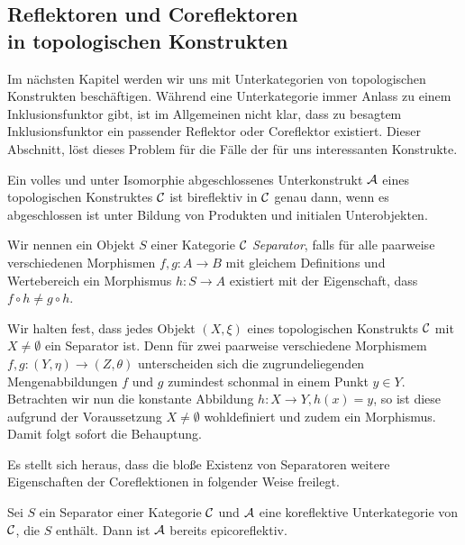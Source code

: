 \subsection{Reflektoren und Coreflektoren\\ in topologischen Konstrukten}

Im nächsten Kapitel werden wir uns mit Unterkategorien von topologischen Konstrukten beschäftigen. Während eine Unterkategorie immer Anlass zu einem Inklusionsfunktor gibt, ist im Allgemeinen nicht klar, dass zu besagtem Inklusionsfunktor ein passender Reflektor oder Coreflektor existiert. 
Dieser Abschnitt, löst dieses Problem für die Fälle der für uns interessanten Konstrukte.


\begin{kor}
  Ein volles und unter Isomorphie abgeschlossenes Unterkonstrukt $\mathcal{A}$ eines topologischen Konstruktes $\mathcal{C}$ ist bireflektiv in $\mathcal{C}$ genau dann, wenn es abgeschlossen ist unter Bildung von Produkten und initialen Unterobjekten.
\end{kor}

\begin{defn}
  Wir nennen ein Objekt $S$ einer Kategorie $\mathcal{C}$ \emph{Separator}, falls für alle paarweise verschiedenen Morphismen $f,g \colon A \to B$ mit gleichem Definitions und Wertebereich ein Morphismus $h \colon S \to A$ existiert mit der Eigenschaft, dass $f \circ h \neq g \circ h$.
\end{defn}

Wir halten fest, dass jedes Objekt $(X,\xi)$ eines topologischen Konstrukts $\mathcal{C}$ mit $X \neq \emptyset$ ein Separator ist. 
Denn für zwei paarweise verschiedene Morphismem $f,g \colon (Y, \eta) \to (Z, \theta)$ unterscheiden sich die zugrundeliegenden Mengenabbildungen $f$ und $g$ zumindest schonmal in einem Punkt $y \in Y$. Betrachten wir nun die konstante Abbildung $h \colon X \to Y, h(x) = y$, so ist diese aufgrund der Voraussetzung $X \neq \emptyset$ wohldefiniert und zudem ein Morphismus.
Damit folgt sofort die Behauptung.

Es stellt sich heraus, dass die bloße Existenz von Separatoren weitere Eigenschaften der Coreflektionen in folgender Weise freilegt.

\begin{thm}
  Sei $S$ ein Separator einer Kategorie $\mathcal{C}$ und $\mathcal{A}$ eine koreflektive Unterkategorie von $\mathcal{C}$, die $S$ enthält.
  Dann ist $\mathcal{A}$ bereits epicoreflektiv.
\end{thm}


